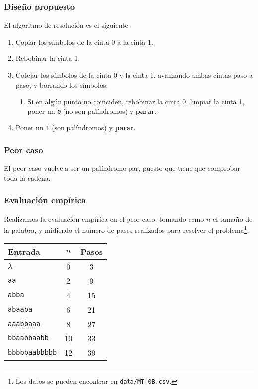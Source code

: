 \subsubsection*{Diseño propuesto}
El algoritmo de resolución es el siguiente:

\begin{enumerate}
    \item Copiar los símbolos de la cinta 0 a la cinta 1.
    \item Rebobinar la cinta 1.
    \item Cotejar los símbolos de la cinta 0 y la cinta 1, avanzando ambas cintas paso a paso, y borrando los símbolos.
    \begin{enumerate}[1.]
        \item Si en algún punto no coinciden, rebobinar la cinta 0, limpiar la cinta 1, poner un \texttt{0} (no son palíndromos) y \textbf{parar}.
    \end{enumerate}
    \item Poner un \texttt{1} (son palíndromos) y \textbf{parar}.
\end{enumerate}




\subsubsection*{Peor caso}
El peor caso vuelve a ser un palíndromo par, puesto que tiene que comprobar toda la cadena.

\subsubsection*{Evaluación empírica}
Realizamos la evaluación empírica en el peor caso, tomando como $n$ el tamaño de la palabra, y midiendo el número de pasos realizados para resolver el problema\footnote{Los datos se pueden encontrar en \texttt{data/MT-0B.csv}.}:

\begin{table}[h]
    \centering
    \begin{tabular}{lcc}
        Entrada & $n$ & Pasos \\
        \hline
        $\lambda$               & 0  & 3  \\
        \texttt{aa}             & 2  & 9  \\
        \texttt{abba}           & 4  & 15 \\
        \texttt{abaaba}         & 6  & 21 \\
        \texttt{aaabbaaa}       & 8  & 27 \\
        \texttt{bbaabbaabb}     & 10 & 33 \\
        \texttt{bbbbbaabbbbb}   & 12 & 39
    \end{tabular}
\end{table}



